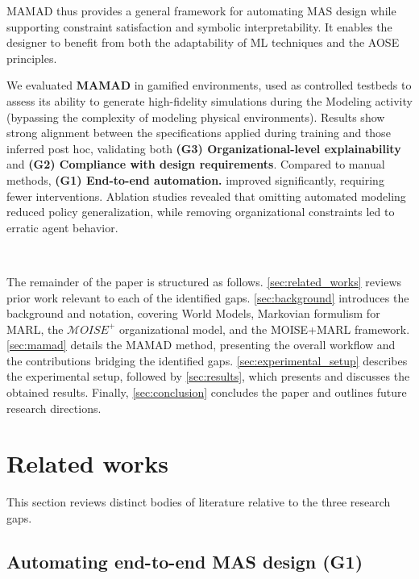 \documentclass[pdflatex,sn-mathphys-num]{sn-jnl}%
\theoremstyle{thmstyleone}%
\theoremstyle{thmstyletwo}%
\theoremstyle{thmstylethree}%
\begin{document}
\noindent MAMAD thus provides a general framework for automating MAS design while supporting constraint satisfaction and symbolic interpretability. It enables the designer to benefit from both the adaptability of ML techniques and the AOSE principles.



We evaluated \textbf{MAMAD} in gamified environments, used as controlled testbeds to assess its ability to generate high-fidelity simulations during the Modeling activity (bypassing the complexity of modeling physical environments). Results show strong alignment between the specifications applied during training and those inferred post hoc, validating both \textbf{(G3) Organizational-level explainability} and \textbf{(G2) Compliance with design requirements}. Compared to manual methods, \textbf{(G1) End-to-end automation.} improved significantly, requiring fewer interventions. Ablation studies revealed that omitting automated modeling reduced policy generalization, while removing organizational constraints led to erratic agent behavior.

\

\noindent The remainder of the paper is structured as follows. \autoref{sec:related_works} reviews prior work relevant to each of the identified gaps. \autoref{sec:background} introduces the background and notation, covering World Models, Markovian formulism for MARL, the $\mathcal{M}OISE^+$ organizational model, and the MOISE+MARL framework. \autoref{sec:mamad} details the MAMAD method, presenting the overall workflow and the contributions bridging the identified gaps. \autoref{sec:experimental_setup} describes the experimental setup, followed by \autoref{sec:results}, which presents and discusses the obtained results. Finally, \autoref{sec:conclusion} concludes the paper and outlines future research directions.


\section{Related works}\label{sec:related_works}

This section reviews distinct bodies of literature relative to the three research gaps.

\subsection{Automating end-to-end MAS design (G1)}
\end{document}
